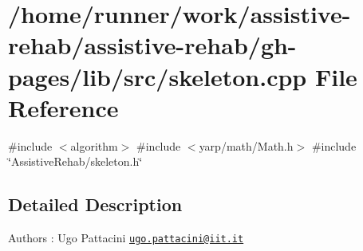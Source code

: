 \section{/home/runner/work/assistive-\/rehab/assistive-\/rehab/gh-\/pages/lib/src/skeleton.cpp File Reference}
\label{skeleton_8cpp}
{\ttfamily \#include $<$algorithm$>$}\newline
{\ttfamily \#include $<$yarp/math/\+Math.\+h$>$}\newline
{\ttfamily \#include \char`\"{}Assistive\+Rehab/skeleton.\+h\char`\"{}}\newline


\subsection{Detailed Description}
\begin{DoxyAuthor}{Authors}
\+: Ugo Pattacini \href{mailto:ugo.pattacini@iit.it}{\tt ugo.\+pattacini@iit.\+it} 
\end{DoxyAuthor}
